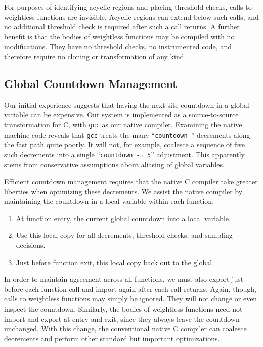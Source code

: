 For purposes of identifying acyclic regions and placing threshold
checks, calls to weightless functions are invisible.  Acyclic regions
can extend below such calls, and no additional threshold check is
required after such a call returns.  A further benefit is that the
bodies of weightless functions may be compiled with no modifications.
They have no threshold checks, no instrumented code, and therefore
require no cloning or transformation of any kind.

\subsection{Global Countdown Management}

Our initial experience suggests that having the next-site countdown in
a global variable can be expensive.  Our system is implemented as a
source-to-source transformation for C, with \texttt{gcc} as our native
compiler.  Examining the native machine code reveals that \texttt{gcc}
treats the many ``\texttt{countdown--}'' decrements along the fast
path quite poorly.  It will not, for example, coalesce a sequence of
five such decrements into a single ``\texttt{countdown -= 5}''
adjustment.  This apparently stems from conservative assumptions about
aliasing of global variables.

Efficient countdown management requires that the native C compiler
take greater liberties when optimizing these decrements.  We assist
the native compiler by maintaining the countdown in a local variable
within each function:

\begin{enumerate}
\item At function entry,  the current global countdown
  into a local variable.
\item Use this local copy for all decrements, threshold checks, and
  sampling decisions.
\item Just before function exit,  this local copy back
  out to the global.
\end{enumerate}

In order to maintain agreement across all functions, we must also
export just before each function call and import again after each call
returns.  Again, though, calls to weightless functions may simply be
ignored.  They will not change or even inspect the countdown.
Similarly, the bodies of weightless functions need not import and
export at entry and exit, since they always leave the countdown
unchanged.  With this change, the conventional native C compiler can
coalesce decrements and perform other standard but important
optimizations.

